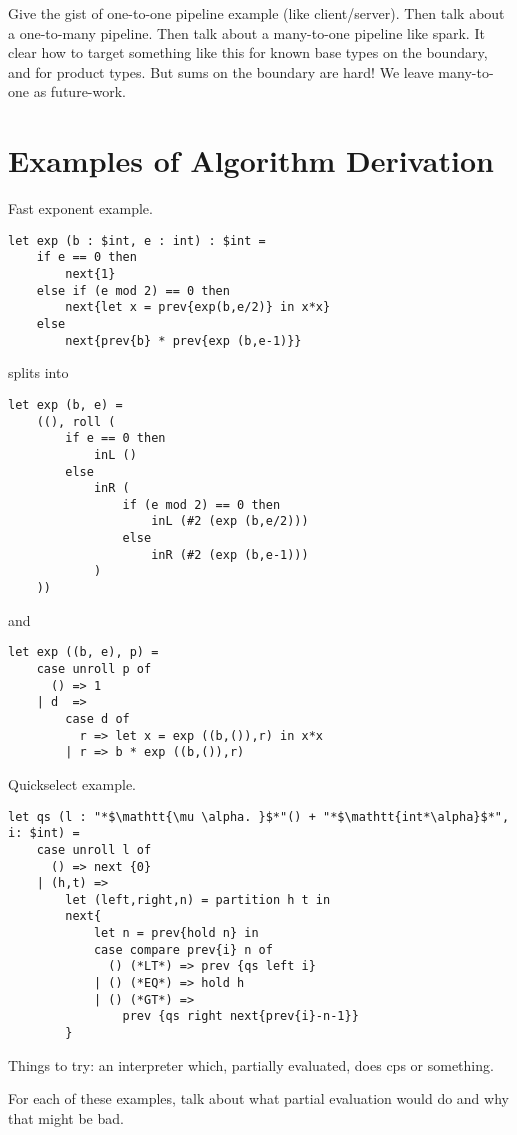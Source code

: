 \documentclass{sigplanconf}
\begin{document}
Give the gist of one-to-one pipeline example (like client/server).
Then talk about a one-to-many pipeline.
Then talk about a many-to-one pipeline like spark.  It clear how to target something like this for known base types on the boundary, and for product types.  But sums on the boundary are hard!  We leave many-to-one as future-work.


\section{Examples of Algorithm Derivation}

Fast exponent example.  

\begin{lstlisting} 
let exp (b : $int, e : int) : $int =
	if e == 0 then
		next{1}
	else if (e mod 2) == 0 then
		next{let x = prev{exp(b,e/2)} in x*x}
	else
		next{prev{b} * prev{exp (b,e-1)}}		
\end{lstlisting}

splits into

\begin{lstlisting} 
let exp (b, e) =
	((), roll (
		if e == 0 then
			inL ()
		else 
			inR (
				if (e mod 2) == 0 then
					inL (#2 (exp (b,e/2)))
				else
					inR (#2 (exp (b,e-1)))
			)
	))
\end{lstlisting}

and

\begin{lstlisting} 
let exp ((b, e), p) =
	case unroll p of
	  () => 1
	| d  =>
		case d of
		  r => let x = exp ((b,()),r) in x*x
		| r => b * exp ((b,()),r)
\end{lstlisting}

Quickselect example.

\begin{lstlisting} 
let qs (l : "*$\mathtt{\mu \alpha. }$*"() + "*$\mathtt{int*\alpha}$*", i: $int) = 
	case unroll l of
	  () => next {0}
	| (h,t) => 
		let (left,right,n) = partition h t in
		next{
			let n = prev{hold n} in
			case compare prev{i} n of
			  () (*LT*) => prev {qs left i}
			| () (*EQ*) => hold h
			| () (*GT*) => 
				prev {qs right next{prev{i}-n-1}}
		}	
\end{lstlisting}

Things to try: an interpreter which, partially evaluated, does cps or something.

For each of these examples, talk about what partial evaluation would do and why that might be bad.
\end{document}
